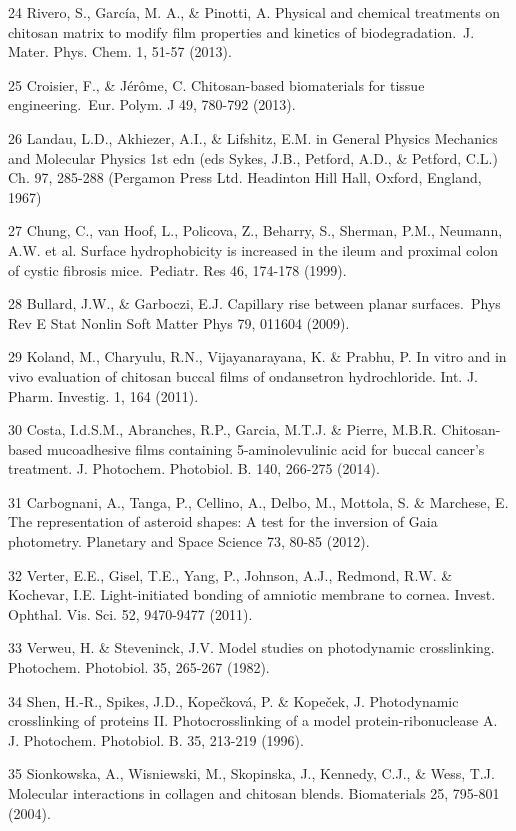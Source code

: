 24	Rivero, S., García, M. A., \& Pinotti, A. Physical and chemical treatments on chitosan matrix to modify film properties and kinetics of biodegradation. J. Mater. Phys. Chem. 1, 51-57 (2013).

25	Croisier, F., \& Jérôme, C. Chitosan-based biomaterials for tissue engineering. Eur. Polym. J 49, 780-792 (2013).

26	Landau, L.D., Akhiezer, A.I., \& Lifshitz, E.M. in General Physics Mechanics and Molecular Physics 1st edn (eds Sykes, J.B., Petford, A.D., \& Petford, C.L.) Ch. 97, 285-288 (Pergamon Press Ltd. Headinton Hill Hall, Oxford, England, 1967)

27	Chung, C., van Hoof, L., Policova, Z., Beharry, S., Sherman, P.M., Neumann, A.W. et al. Surface hydrophobicity is increased in the ileum and proximal colon of cystic fibrosis mice. Pediatr. Res 46, 174-178 (1999).

28	Bullard, J.W., \& Garboczi, E.J. Capillary rise between planar surfaces. Phys Rev E Stat Nonlin Soft Matter Phys 79, 011604 (2009).

29	Koland, M., Charyulu, R.N., Vijayanarayana, K. \& Prabhu, P. In vitro and in vivo evaluation of chitosan buccal films of ondansetron hydrochloride. Int. J. Pharm. Investig. 1, 164 (2011). 

30	Costa, I.d.S.M., Abranches, R.P., Garcia, M.T.J. \& Pierre, M.B.R. Chitosan-based mucoadhesive films containing 5-aminolevulinic acid for buccal cancer’s treatment. J. Photochem. Photobiol. B. 140, 266-275 (2014). 

31	Carbognani, A., Tanga, P., Cellino, A., Delbo, M., Mottola, S. \& Marchese, E. The representation of asteroid shapes: A test for the inversion of Gaia photometry. Planetary and Space Science 73, 80-85 (2012). 

32	Verter, E.E., Gisel, T.E., Yang, P., Johnson, A.J., Redmond, R.W. \& Kochevar, I.E. Light-initiated bonding of amniotic membrane to cornea. Invest. Ophthal. Vis. Sci. 52, 9470-9477 (2011). 

33	Verweu, H. \& Steveninck, J.V. Model studies on photodynamic crosslinking. Photochem. Photobiol. 35, 265-267 (1982).

34	Shen, H.-R., Spikes, J.D., Kopečková, P. \& Kopeček, J. Photodynamic crosslinking of proteins II. Photocrosslinking of a model protein-ribonuclease A. J. Photochem. Photobiol. B. 35, 213-219 (1996).

35	Sionkowska, A., Wisniewski, M., Skopinska, J., Kennedy, C.J., \& Wess, T.J. Molecular interactions in collagen and chitosan blends. Biomaterials 25, 795-801 (2004).

